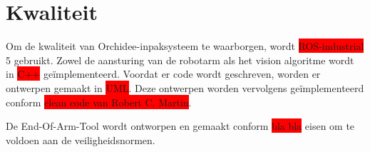 \section{Kwaliteit}

Om de kwaliteit van Orchidee-inpaksysteem te waarborgen, wordt \colorbox{red}{ROS-industrial} 5 gebruikt. 
Zowel de aansturing van de robotarm als het vision algoritme wordt in \colorbox{red}{C++} geïmplementeerd.
Voordat er code wordt geschreven, worden er ontwerpen gemaakt in \colorbox{red}{UML}.
Deze ontwerpen worden vervolgens geïmplementeerd conform \colorbox{red}{clean code van Robert C. Martin}.

De End-Of-Arm-Tool wordt ontworpen en gemaakt conform \colorbox{red}{bla bla} eisen om te voldoen aan de veiligheidsnormen.

\newpage